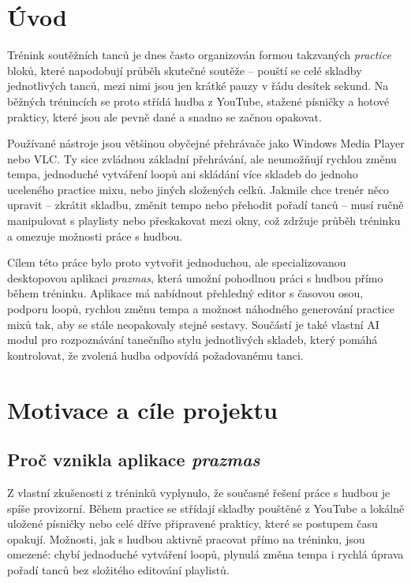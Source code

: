 \documentclass[12pt, a4paper,
]{report}
\begin{document}

\chapter*{Úvod}

Trénink soutěžních tanců je dnes často organizován formou takzvaných \emph{practice} bloků, které napodobují průběh skutečné soutěže – pouští se celé skladby jednotlivých tanců, mezi nimi jsou jen krátké pauzy v řádu desítek sekund. Na běžných trénincích se proto střídá hudba z YouTube, stažené písničky a hotové prakticy, které jsou ale pevně dané a snadno se začnou opakovat.

Používané nástroje jsou většinou obyčejné přehrávače jako Windows Media Player nebo VLC. Ty sice zvládnou základní přehrávání, ale neumožňují rychlou změnu tempa, jednoduché vytváření loopů ani skládání více skladeb do jednoho uceleného practice mixu, nebo jiných složených celků. Jakmile chce trenér něco upravit – zkrátit skladbu, změnit tempo nebo přehodit pořadí tanců – musí ručně manipulovat s playlisty nebo přeskakovat mezi okny, což zdržuje průběh tréninku a omezuje možnosti práce s hudbou.

Cílem této práce bylo proto vytvořit jednoduchou, ale specializovanou desktopovou aplikaci \textit{prazmas}, která umožní pohodlnou práci s hudbou přímo během tréninku. Aplikace má nabídnout přehledný editor s časovou osou, podporu loopů, rychlou změnu tempa a možnost náhodného generování practice mixů tak, aby se stále neopakovaly stejné sestavy. Součástí je také vlastní AI modul pro rozpoznávání tanečního stylu jednotlivých skladeb, který pomáhá kontrolovat, že zvolená hudba odpovídá požadovanému tanci.

\chapter{Motivace a cíle projektu}

\section{Proč vznikla aplikace \textit{prazmas}}

Z vlastní zkušenosti z tréninků vyplynulo, že současné řešení práce s hudbou je spíše provizorní. Během practice se střídají skladby pouštěné z YouTube a lokálně uložené písničky nebo celé dříve připravené prakticy, které se postupem času opakují. Možnosti, jak s hudbou aktivně pracovat přímo na tréninku, jsou omezené: chybí jednoduché vytváření loopů, plynulá změna tempa i rychlá úprava pořadí tanců bez složitého editování playlistů.
\end{document}
